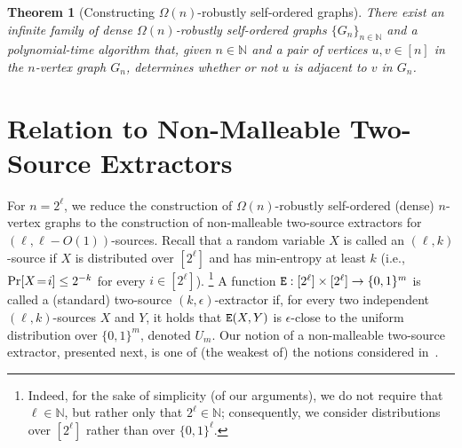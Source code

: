 \documentclass[10pt,a4paper]{article}
\newtheorem{theorem}{Theorem}[section]
\theoremstyle{definition}
\newcommand{\N}{\mathbb N}
\newcommand{\prob}{{\rm Pr}}
\newcommand{\e}{\epsilon}
\newcommand{\bitset}{\{0,1\}}
\newcommand{\BT}{\begin{theorem}}   \newcommand{\ET}{\end{theorem}}
\begin{document}
\setcounter{theorem}{3}\BT[Constructing $\Omega(n)$-robustly self-ordered graphs]
\label{dense:ithm} 
There exist an infinite family
of dense $\Omega(n)$-robustly self-ordered graphs $\{G_n\}_{n\in\N}$
and a polynomial-time algorithm that,
given $n\in\N$ and a pair of vertices $u,v\in[n]$
in the $n$-vertex graph $G_n$,
determines whether or not $u$ is adjacent to $v$ in $G_n$.
\ET

\setcounter{section}{7}\section{Relation to Non-Malleable Two-Source Extractors}
\label{dense+nmE:sec}
%
%
For $n=2^\ell$,
we reduce the construction of $\Omega(n)$-robustly self-ordered
(dense) $n$-vertex graphs
to the construction of non-malleable two-source extractors
for $(\ell,\ell-O(1))$-sources.
Recall that a random variable $X$ is called an {\sf $(\ell,k)$-source}
if $X$ is distributed over $[2^\ell]$ and has min-entropy at least $k$
(i.e., $\prob[X\!=\!i]\leq2^{-k}$ for every $i\in[2^\ell]$).
\footnote{Indeed, for the sake of simplicity (of our arguments),
we do not require that $\ell\in\N$,
but rather only that $2^\ell\in\N$;
consequently, we consider distributions over $[2^\ell]$
rather than over $\bitset^\ell$.}
%
A function ${\tt E}:[2^\ell]\times[2^\ell]\to\bitset^m$
is called a (standard) {\sf two-source $(k,\e)$-extractor}
if, for every two independent $(\ell,k)$-sources $X$ and $Y$,
it holds that ${\tt E}(X,Y)$ is $\e$-close to the uniform
distribution over $\bitset^m$, denoted $U_m$.
Our notion of a non-malleable two-source extractor, presented next,
is one of (the weakest of) the notions considered in~\cite{CG:nmE,CGL}.
\end{document}
